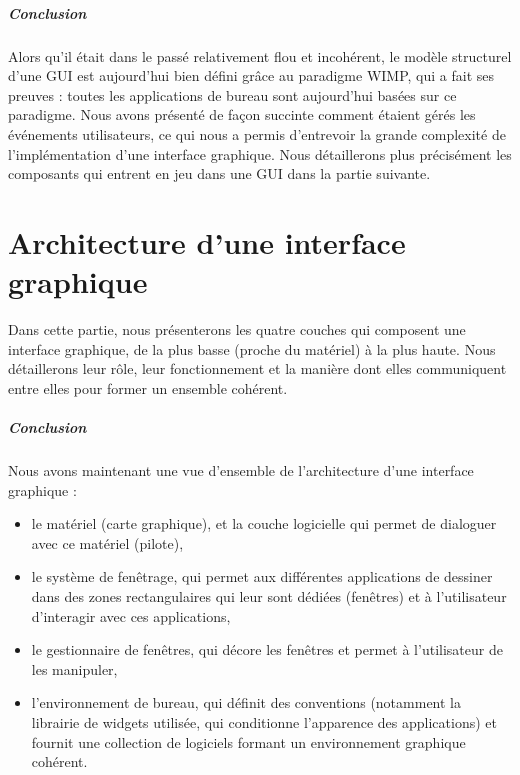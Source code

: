 \documentclass[a4paper,11pt]{report}
\begin{document}
\paragraph{Conclusion} 
Alors qu'il était dans le passé relativement flou et incohérent, le modèle structurel d'une GUI est aujourd'hui bien défini grâce au paradigme WIMP, qui a fait ses preuves : toutes les applications de bureau sont aujourd'hui basées sur ce paradigme. Nous avons présenté de façon succinte comment étaient gérés les événements utilisateurs, ce qui nous a permis d'entrevoir la grande complexité de l'implémentation d'une interface graphique. Nous détaillerons plus précisément les composants qui entrent en jeu dans une GUI dans la partie suivante.

\chapter{Architecture d'une interface graphique}

Dans cette partie, nous présenterons les quatre couches qui composent une interface graphique, de la plus basse (proche du matériel) à la plus haute. Nous détaillerons leur rôle, leur fonctionnement et la manière dont elles communiquent entre elles pour former un ensemble cohérent. 





\paragraph{Conclusion} Nous avons maintenant une vue d'ensemble de l'architecture d'une interface graphique :
\begin{itemize}
 \item le matériel (carte graphique), et la couche logicielle qui permet de dialoguer avec ce matériel (pilote),
 \item le système de fenêtrage, qui permet aux différentes applications de dessiner dans des zones rectangulaires qui leur sont dédiées (fenêtres) et à l'utilisateur d'interagir avec ces applications,
 \item le gestionnaire de fenêtres, qui décore les fenêtres et permet à l'utilisateur de les manipuler,
 \item l'environnement de bureau, qui définit des conventions (notamment la librairie de widgets utilisée, qui conditionne l'apparence des applications) et fournit une collection de logiciels formant un environnement graphique cohérent.
\end{itemize}
\end{document}
